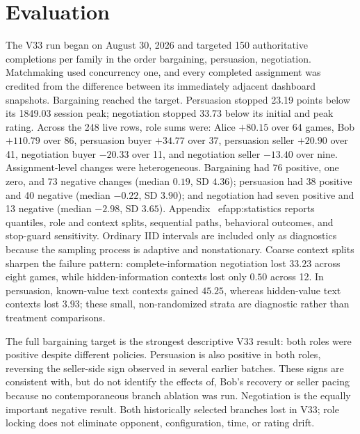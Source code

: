 \section{Evaluation}



The V33 run began on August 30, 2026 and targeted 150 authoritative completions
per family in the order bargaining, persuasion, negotiation. Matchmaking used
concurrency one, and every completed assignment was credited from the difference
between its immediately adjacent dashboard snapshots. Bargaining reached the
target. Persuasion stopped 23.19 points below its 1849.03 session peak;
negotiation stopped 33.73 below its initial and peak rating. Across the 248 live
rows, role sums were: Alice $+80.15$ over 64 games, Bob $+110.79$ over 86,
persuasion buyer $+34.77$ over 37, persuasion seller $+20.90$ over 41,
negotiation buyer $-20.33$ over 11, and negotiation seller $-13.40$ over nine.
Assignment-level changes were heterogeneous. Bargaining had 76 positive, one
zero, and 73 negative changes (median $0.19$, SD $4.36$); persuasion had
38 positive and 40 negative (median $-0.22$, SD $3.90$); and negotiation had
seven positive and 13 negative (median $-2.98$, SD $3.65$). Appendix~
ef{app:statistics}
reports quantiles, role and context splits, sequential paths, behavioral
outcomes, and stop-guard sensitivity. Ordinary IID intervals are included only
as diagnostics because the sampling process is adaptive and nonstationary.
Coarse context splits sharpen the failure pattern: complete-information
negotiation lost $33.23$ across eight games, while hidden-information contexts
lost only $0.50$ across 12. In persuasion, known-value text contexts gained
$45.25$, whereas hidden-value text contexts lost $3.93$; these small,
non-randomized strata are diagnostic rather than treatment comparisons.

The full bargaining target is the strongest descriptive V33 result: both roles
were positive despite different policies. Persuasion is also positive in both
roles, reversing the seller-side sign observed in several earlier batches.
These signs are consistent with, but do not identify the effects of, Bob's
recovery or seller pacing because no contemporaneous branch ablation was run.
Negotiation is the equally important negative result. Both historically selected
branches lost in V33; role locking does not eliminate opponent, configuration,
time, or rating drift.

